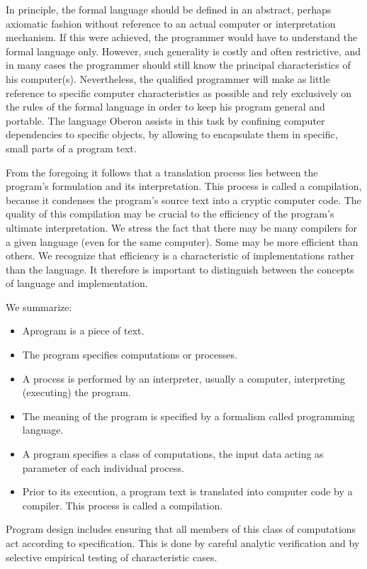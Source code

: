 In principle, the formal language should be defined in an abstract, perhaps axiomatic fashion
without reference to an actual computer or interpretation mechanism. If this were achieved, the
programmer would have to understand the formal language only. However, such generality is costly
and often restrictive, and in many cases the programmer should still know the principal
characteristics of his computer(s). Nevertheless, the qualified programmer will make as little
reference to specific computer characteristics as possible and rely exclusively on the rules of the
formal language in order to keep his program general and portable. The language Oberon assists in
this task by confining computer dependencies to specific objects, by allowing to encapsulate them
in specific, small parts of a program text.

From the foregoing it follows that a translation process lies between the program's formulation and
its interpretation. This process is called a compilation, because it condenses the program's source
text into a cryptic computer code. The quality of this compilation may be crucial to the efficiency of
the program's ultimate interpretation. We stress the fact that there may be many compilers for a
given language (even for the same computer). Some may be more efficient than others. We
recognize that efficiency is a characteristic of implementations rather than the language. It therefore
is important to distinguish between the concepts of language and implementation.

We summarize:
\begin{itemize}
  \item Aprogram is a piece of text.
  \item The program specifies computations or processes.
  \item A process is performed by an interpreter, usually a computer, interpreting (executing) the program.
  \item The meaning of the program is specified by a formalism called programming language.
  \item A program specifies a class of computations, the input data acting as parameter of each individual process.
  \item Prior to its execution, a program text is translated into computer code by a compiler. This process is called a compilation.
\end{itemize}

Program design includes ensuring that all members of this class of computations act according to
specification. This is done by careful analytic verification and by selective empirical testing of
characteristic cases.

